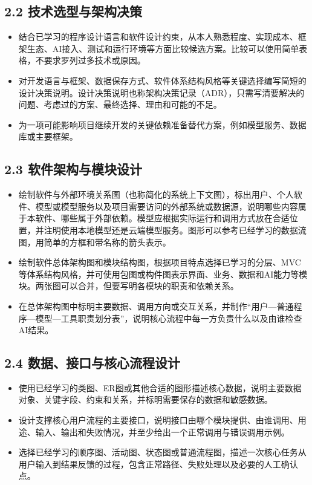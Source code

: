 \documentclass[UTF8,12pt,a4paper]{ctexart}
\begin{document}
\subsection*{2.2 技术选型与架构决策}

\begin{itemize}
  \item 结合已学习的程序设计语言和软件设计约束，从本人熟悉程度、实现成本、框架生态、AI接入、测试和运行环境等方面比较候选方案。比较可以使用简单表格，不要求罗列过多技术或原因。
  \item 对开发语言与框架、数据保存方式、软件体系结构风格等关键选择编写简短的设计决策说明。设计决策说明也称架构决策记录（ADR），只需写清要解决的问题、考虑过的方案、最终选择、理由和可能的不足。
  \item 为一项可能影响项目继续开发的关键依赖准备替代方案，例如模型服务、数据库或主要框架。
\end{itemize}

\subsection*{2.3 软件架构与模块设计}

\begin{itemize}
  \item 绘制软件与外部环境关系图（也称简化的系统上下文图），标出用户、个人软件、模型或模型服务以及项目需要访问的外部系统或数据源，说明哪些内容属于本软件、哪些属于外部依赖。模型应根据实际运行和调用方式放在合适位置，并注明使用本地模型还是云端模型服务。图形可以参考已经学习的数据流图，用简单的方框和带名称的箭头表示。
  \item 绘制软件总体架构图和模块结构图，根据项目特点选择已学习的分层、MVC等体系结构风格，并可使用包图或构件图表示界面、业务、数据和AI能力等模块。两张图可以合并，但要写明各模块的职责和依赖关系。
  \item 在总体架构图中标明主要数据、调用方向或交互关系，并制作“用户—普通程序—模型—工具职责划分表”，说明核心流程中每一方负责什么以及由谁检查AI结果。
\end{itemize}

\subsection*{2.4 数据、接口与核心流程设计}

\begin{itemize}
  \item 使用已经学习的类图、ER图或其他合适的图形描述核心数据，说明主要数据对象、关键字段、约束和关系，并标明需要保存的数据和敏感数据。
  \item 设计支撑核心用户流程的主要接口，说明接口由哪个模块提供、由谁调用、用途、输入、输出和失败情况，并至少给出一个正常调用与错误调用示例。
  \item 选择已经学习的顺序图、活动图、状态图或普通流程图，描述一次核心任务从用户输入到结果反馈的过程，包含正常路径、失败处理以及必要的人工确认点。
\end{itemize}
\end{document}
